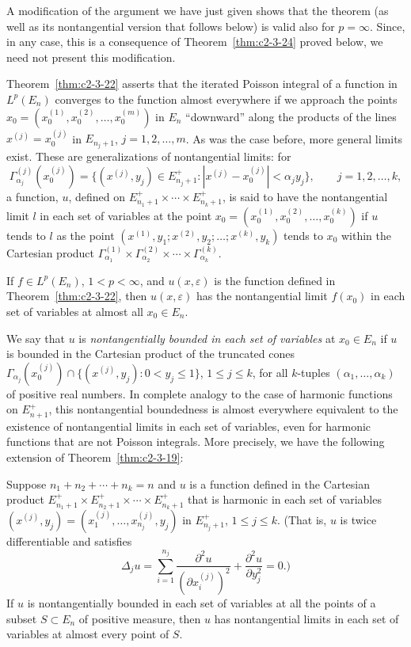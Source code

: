 A modification of the argument we have just given shows that the theorem (as well as its nontangential version that follows below) is valid also for $p = \infty$. Since, in any case, this is a consequence of Theorem~\ref{thm:c2-3-24} proved below, we need not present this modification.

Theorem~\ref{thm:c2-3-22} asserts that the iterated Poisson integral of a function in $L^p(E_n)$ converges to the function almost everywhere if we approach the points $x_0 = (x_0^{(1)}, x_0^{(2)}, \dots, x_0^{(m)})$ in $E_n$ ``downward'' along the products of the lines $x^{(j)} = x_0^{(j)}$ in $E_{n_j+1}$, $j = 1, 2, \dots, m$. As was the case before, more general limits exist. These are generalizations of nontangential limits: for
\[
\Gamma_{\alpha_j}^{(j)}(x_0^{(j)}) = \{(x^{(j)}, y_j) \in E_{n_j+1}^+ : |x^{(j)} - x_0^{(j)}| < \alpha_j y_j\}, \qquad j = 1, 2, \dots, k,
\]
a function, $u$, defined on $E_{n_1+1}^+ \times \cdots \times E_{n_k+1}^+$, is said to have the nontangential limit $l$ in each set of variables at the point $x_0 = (x_0^{(1)}, x_0^{(2)}, \dots, x_0^{(k)})$ if $u$ tends to $l$ as the point $(x^{(1)}, y_1; x^{(2)}, y_2; \dots; x^{(k)}, y_k)$ tends to $x_0$ within the Cartesian product $\Gamma_{\alpha_1}^{(1)} \times \Gamma_{\alpha_2}^{(2)} \times \cdots \times \Gamma_{\alpha_k}^{(k)}$.

\begin{corollary}\label{cor:c2-3-23}
If $f \in L^p(E_n)$, $1 < p < \infty$, and $u(x, \varepsilon)$ is the function defined in Theorem~\ref{thm:c2-3-22}, then $u(x, \varepsilon)$ has the nontangential limit $f(x_0)$ in each set of variables at almost all $x_0 \in E_n$.
\end{corollary}

We say that $u$ is \emph{nontangentially bounded in each set of variables} at $x_0 \in E_n$ if $u$ is bounded in the Cartesian product of the truncated cones $\Gamma_{\alpha_j}(x_0^{(j)}) \cap \{(x^{(j)}, y_j) : 0 < y_j \leq 1\}$, $1 \leq j \leq k$, for all $k$-tuples $(\alpha_1, \dots, \alpha_k)$ of positive real numbers. In complete analogy to the case of harmonic functions on $E_{n+1}^+$, this nontangential boundedness is almost everywhere equivalent to the existence of nontangential limits in each set of variables, even for harmonic functions that are not Poisson integrals. More precisely, we have the following extension of Theorem~\ref{thm:c2-3-19}:

\begin{theorem}\label{thm:c2-3-24}
Suppose $n_1 + n_2 + \cdots + n_k = n$ and $u$ is a function defined in the Cartesian product $E_{n_1+1}^+ \times E_{n_2+1}^+ \times \cdots \times E_{n_k+1}^+$ that is harmonic in each set of variables $(x^{(j)}, y_j) = (x_1^{(j)}, \dots, x_{n_j}^{(j)}, y_j)$ in $E_{n_j+1}^+$, $1 \leq j \leq k$. (That is, $u$ is twice differentiable and satisfies
\[
\Delta_j u = \sum_{i=1}^{n_j} \frac{\partial^2 u}{(\partial x_i^{(j)})^2} + \frac{\partial^2 u}{\partial y_j^2} = 0.)
\]
If $u$ is nontangentially bounded in each set of variables at all the points of a subset $S \subset E_n$ of positive measure, then $u$ has nontangential limits in each set of variables at almost every point of $S$.
\end{theorem}

